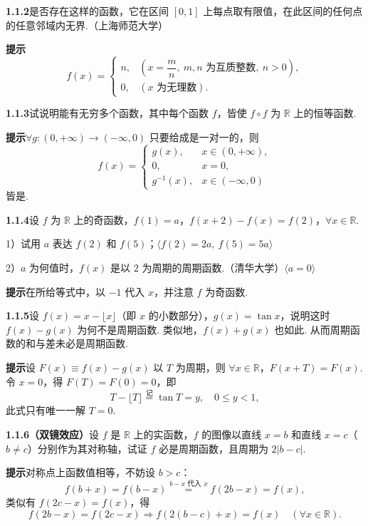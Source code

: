 \documentclass[UTF8, 12pt, fontset=fandol, oneside]{ctexart}
\begin{document}
\noindent\textbf{1.1.2}\quad 是否存在这样的函数，它在区间 $[0,1]$ 上每点取有限值，在此区间的任何点的任意邻域内无界.（上海师范大学）

\noindent\textbf{提示}\quad
\[
f(x)=
\begin{cases}
n, & \left(x=\dfrac mn,\ m,n\text{ 为互质整数},\ n>0\right),\\
0, & (x\text{ 为无理数}).
\end{cases}
\]

\noindent\textbf{1.1.3}\quad 试说明能有无穷多个函数，其中每个函数 $f$，皆使 $f\circ f$ 为 $\mathbb{R}$ 上的恒等函数.

\noindent\textbf{提示}\quad $\forall g:(0,+\infty)\to(-\infty,0)$ 只要给成是一对一的，则
\[
f(x)=
\begin{cases}
g(x), & x\in(0,+\infty),\\
0, & x=0,\\
g^{-1}(x), & x\in(-\infty,0)
\end{cases}
\]
皆是.

\noindent\textbf{1.1.4}\quad 设 $f$ 为 $\mathbb{R}$ 上的奇函数，$f(1)=a$，$f(x+2)-f(x)=f(2)$，$\forall x\in\mathbb{R}$.

1）试用 $a$ 表达 $f(2)$ 和 $f(5)$；\hfill $\langle f(2)=2a,\ f(5)=5a\rangle$

2）$a$ 为何值时，$f(x)$ 是以 $2$ 为周期的周期函数.（清华大学）\hfill $\langle a=0\rangle$

\noindent\textbf{提示}\quad 在所给等式中，以 $-1$ 代入 $x$，并注意 $f$ 为奇函数.

\noindent\textbf{1.1.5}\quad 设 $f(x)=x-\lfloor x\rfloor$（即 $x$ 的小数部分），$g(x)=\tan x$，说明这时 $f(x)-g(x)$ 为何不是周期函数. 类似地，$f(x)+g(x)$ 也如此. 从而周期函数的和与差未必是周期函数.

\noindent\textbf{提示}\quad 设 $F(x)\equiv f(x)-g(x)$ 以 $T$ 为周期，则 $\forall x\in\mathbb{R}$，$F(x+T)=F(x)$. 令 $x=0$，得 $F(T)=F(0)=0$，即
\[
  T-\lfloor T\rfloor\stackrel{\text{记}}{=}\tan T=y,\quad 0\le y<1,
\]
此式只有唯一一解 $T=0$.

\noindent\textbf{1.1.6（双镜效应）}\quad 设 $f$ 是 $\mathbb{R}$ 上的实函数，$f$ 的图像以直线 $x=b$ 和直线 $x=c$（$b\ne c$）分别作为其对称轴，试证 $f$ 必是周期函数，且周期为 $2|b-c|$.

\noindent\textbf{提示}\quad 对称点上函数值相等，不妨设 $b>c$：
\[
  f(b+x)=f(b-x)\overset{b-x\text{ 代入 }x}{=} f(2b-x)=f(x),
\]
类似有 $f(2c-x)=f(x)$，得
\[
  f(2b-x)=f(2c-x)\Rightarrow f(2(b-c)+x)=f(x)\quad(\forall x\in\mathbb{R}).
\]
\end{document}
